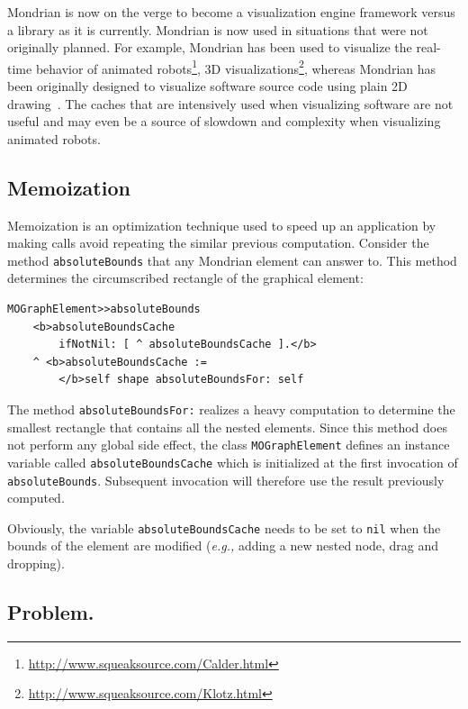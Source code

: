 \documentclass[preprint,10pt]{sigplanconf}
\newcommand{\ct}{\lstinline[backgroundcolor=\color{white},basicstyle=\footnotesize\ttfamily]}
\newcommand{\eg}{\emph{e.g.,}\xspace}
\begin{document}
Mondrian is now on the verge to become a visualization engine framework versus a library as it is currently. Mondrian is now used in situations that were not originally planned. For example, Mondrian has been used to visualize the real-time behavior of animated robots\footnote{\url{http://www.squeaksource.com/Calder.html}}, 3D visualizations\footnote{\url{http://www.squeaksource.com/Klotz.html}}, whereas Mondrian has been originally designed to visualize software source code using plain 2D drawing~\cite{Lanz03d}. The caches that are intensively used when visualizing software are not useful and may even be a source of slowdown and complexity when visualizing animated robots. 


\subsection{Memoization}

Memoization is an optimization technique used to speed up an application by making calls avoid repeating the similar previous computation. Consider the method \texttt{absoluteBounds} that any Mondrian element can answer to. This method determines the circumscribed rectangle of the graphical element:

\begin{lstlisting} 
MOGraphElement>>absoluteBounds
	<b>absoluteBoundsCache 
		ifNotNil: [ ^ absoluteBoundsCache ].</b>
	^ <b>absoluteBoundsCache := 
		</b>self shape absoluteBoundsFor: self
\end{lstlisting}

The method \ct{absoluteBoundsFor:} realizes a heavy computation to determine the smallest rectangle that contains all the nested elements. Since this method does not perform any global side effect, the class \ct{MOGraphElement} defines an instance variable called \ct{absoluteBoundsCache} which is initialized at the first invocation of \ct{absoluteBounds}. Subsequent invocation will therefore use the result previously computed. 

Obviously, the variable \ct{absoluteBoundsCache} needs to be set to \ct{nil} when the bounds of the element are modified (\eg adding a new nested node, drag and dropping).


\subsection{Problem.}
\end{document}

